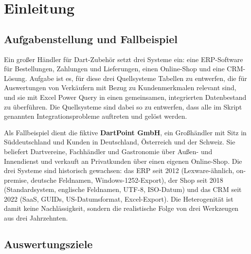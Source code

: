 \section{Einleitung}\label{sec:einleitung}


\subsection{Aufgabenstellung und Fallbeispiel}

Ein großer Händler für Dart-Zubehör setzt drei Systeme ein: eine ERP-Software für Bestellungen, Zahlungen und Lieferungen, einen Online-Shop und eine CRM-Lösung. Aufgabe ist es, für diese drei Quellsysteme Tabellen zu entwerfen, die für Auswertungen von Verkäufern mit Bezug zu Kundenmerkmalen relevant sind, und sie mit Excel Power Query in einen gemeinsamen, integrierten Datenbestand zu überführen. Die Quellsysteme sind dabei so zu entwerfen, dass alle im Skript genannten Integrationsprobleme auftreten und gelöst werden.

Als Fallbeispiel dient die fiktive \textbf{DartPoint GmbH}, ein Großhändler mit Sitz in Süddeutschland und Kunden in Deutschland, Österreich und der Schweiz. Sie beliefert Dartvereine, Fachhändler und Gastronomie über Außen- und Innendienst und verkauft an Privatkunden über einen eigenen Online-Shop. Die drei Systeme sind historisch gewachsen: das ERP seit 2012 (Lexware-ähnlich, on-premise, deutsche Feldnamen, Windows-1252-Export), der Shop seit 2018 (Standardsystem, englische Feldnamen, UTF-8, ISO-Datum) und das CRM seit 2022 (SaaS, GUIDs, US-Datumsformat, Excel-Export). Die Heterogenität ist damit keine Nachlässigkeit, sondern die realistische Folge von drei Werkzeugen aus drei Jahrzehnten.

\subsection{Auswertungsziele}

